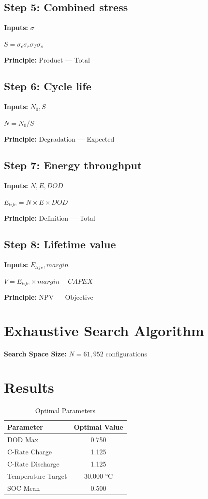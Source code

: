 \documentclass[11pt,twocolumn]{article}
\begin{document}
\subsection*{Step 5: Combined stress}
\textbf{Inputs:} $\sigma$

$S = \sigma_c \sigma_r \sigma_T \sigma_s$

\textbf{Principle:} Product --- Total

\subsection*{Step 6: Cycle life}
\textbf{Inputs:} $N_0, S$

$N = N_0 / S$

\textbf{Principle:} Degradation --- Expected

\subsection*{Step 7: Energy throughput}
\textbf{Inputs:} $N, E, DOD$

$E_{life} = N \times E \times DOD$

\textbf{Principle:} Definition --- Total

\subsection*{Step 8: Lifetime value}
\textbf{Inputs:} $E_{life}, margin$

$V = E_{life} \times margin - CAPEX$

\textbf{Principle:} NPV --- Objective


\section{Exhaustive Search Algorithm}

\textbf{Search Space Size:} $N = 61,952$ configurations

\section{Results}

\begin{table}[h]
\centering
\caption{Optimal Parameters}
\begin{tabular}{@{}lc@{}}
\toprule
Parameter & Optimal Value \\
\midrule
DOD Max & 0.750  \\
C-Rate Charge & 1.125  \\
C-Rate Discharge & 1.125  \\
Temperature Target & 30.000 °C \\
SOC Mean & 0.500  \\
\bottomrule
\end{tabular}
\end{table}
\end{document}
